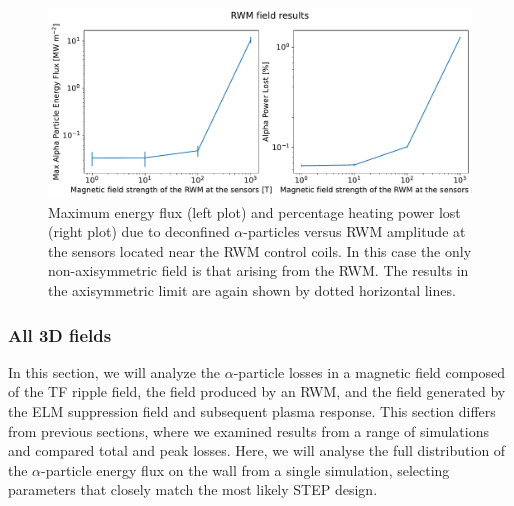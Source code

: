 \documentclass[10pt, a4paper, twoside]{article}
\begin{document}
\begin{figure}[!htpb]
    \centering
    \includegraphics[width=0.99\linewidth]{Figures/max_and_total_flux_vs_bscale.pdf}
    \caption{Maximum energy flux (left plot) and percentage heating power lost (right plot) due to deconfined $\alpha$-particles versus RWM amplitude at the sensors located near the RWM control coils. In this case the only non-axisymmetric field is that arising from the RWM. The results in the axisymmetric limit are again shown by dotted horizontal lines.}
    \label{fig:max_and_total_flux_vs_bscale_rwm}
\end{figure}





\newpage
\clearpage
\subsubsection{All 3D fields}
\label{sec:all_3d_fields}

In this section, we will analyze the $\alpha$-particle losses in a magnetic field composed of the TF ripple field, the field produced by an RWM, and the field generated by the ELM suppression field and subsequent plasma response. This section differs from previous sections, where we examined results from a range of simulations and compared total and peak losses. Here, we will analyse the full distribution of the $\alpha$-particle energy flux on the wall from a single simulation, selecting parameters that closely match the most likely STEP design.
\end{document}
